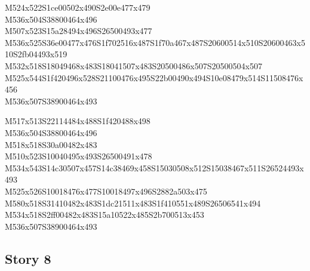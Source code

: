 \documentclass{article}
\begin{document}
\begin{multicols}{5}
\begin{center}
M524x522S1ce00502x490S2e00e477x479 %
\\M536x504S38800464x496 %
\\M507x523S15a28494x496S26500493x477 %
\\M536x525S36e00477x476S1f702516x487S1f70a467x487S20600514x510S20600463x510S2fb04493x519 %
\\M532x518S18049468x483S18041507x483S20500486x507S20500504x507 %
\\M525x544S1f420496x528S21100476x495S22b00490x494S10e08479x514S11508476x456 %
\\M536x507S38900464x493 %
\vfil
\columnbreak

M517x513S22114484x488S1f420488x498 %
\\M536x504S38800464x496 %
\\M518x518S30a00482x483 %
\\M510x523S10040495x493S26500491x478 %
\\M534x543S14c30507x457S14c38469x458S15030508x512S15038467x511S26524493x493 %
\\M525x526S10018476x477S10018497x496S2882a503x475 %
\\M580x518S31410482x483S1dc21511x483S1f410551x489S26506541x494 %
\\M534x518S2ff00482x483S15a10522x485S2b700513x453 %
\\M536x507S38900464x493 %
\vfil

\end{center}
\end{multicols}

\subsection{Story 8}
\end{document}
